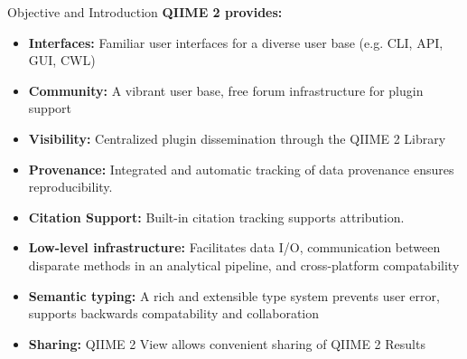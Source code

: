 \documentclass[final]{beamer}
\newlength{\colwidth}
\begin{document}
\begin{frame}[t]
\begin{columns}[t]
\begin{column}{\colwidth}
\begin{block}{Objective and Introduction}
    \textbf{QIIME 2 provides:}
    \begin{itemize}
      \item \textbf{Interfaces:} Familiar user interfaces for a diverse
      user base (e.g. CLI, API, GUI, CWL)
      \item \textbf{Community:} A vibrant user base, free forum infrastructure for
      plugin support
      \item \textbf{Visibility:} Centralized plugin dissemination through the QIIME 2
      Library
      \item \textbf{Provenance:} Integrated and automatic tracking of data provenance
      ensures reproducibility.
      \item \textbf{Citation Support:} Built-in citation tracking supports attribution.
      \item \textbf{Low-level infrastructure:} Facilitates data I/O, communication
      between disparate methods in an analytical pipeline, and cross-platform compatability
      \item \textbf{Semantic typing:} A rich and extensible type system prevents user
      error, supports backwards compatability and collaboration
      \item \textbf{Sharing:} QIIME 2 View allows convenient sharing of QIIME 2 Results
    \end{itemize}
  \end{block}



\end{column}
\end{columns}
\end{frame}
\end{document}
